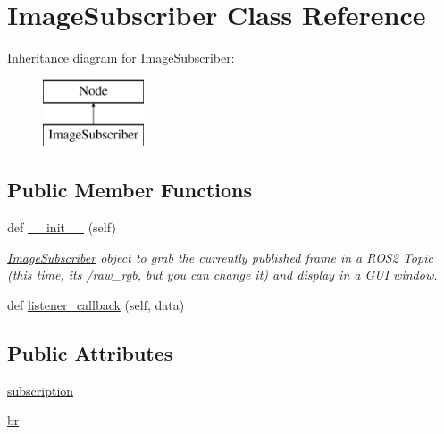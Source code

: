 \hypertarget{classtoxic__vision_1_1webcam__sub_1_1ImageSubscriber}{}\section{Image\+Subscriber Class Reference}
\label{classtoxic__vision_1_1webcam__sub_1_1ImageSubscriber}
Inheritance diagram for Image\+Subscriber\+:\begin{figure}[H]
\begin{center}
\leavevmode
\includegraphics[height=2.000000cm]{db/dd5/classtoxic__vision_1_1webcam__sub_1_1ImageSubscriber}
\end{center}
\end{figure}
\subsection*{Public Member Functions}
\begin{DoxyCompactItemize}
\item 
def \mbox{\hyperlink{classtoxic__vision_1_1webcam__sub_1_1ImageSubscriber_ae64f0875afe3067b97ba370b354b9213}{\+\_\+\+\_\+init\+\_\+\+\_\+}} (self)
\begin{DoxyCompactList}\small\item\em \mbox{\hyperlink{classtoxic__vision_1_1webcam__sub_1_1ImageSubscriber}{Image\+Subscriber}} object to grab the currently published frame in a R\+O\+S2 Topic (this time, it\textquotesingle{}s \textquotesingle{}/raw\+\_\+rgb\textquotesingle{}, but you can change it) and display in a G\+UI window. \end{DoxyCompactList}\item 
def \mbox{\hyperlink{classtoxic__vision_1_1webcam__sub_1_1ImageSubscriber_a23dd9943cb7cb7be2a6e7022a85a1684}{listener\+\_\+callback}} (self, data)
\end{DoxyCompactItemize}
\subsection*{Public Attributes}
\begin{DoxyCompactItemize}
\item 
\mbox{\hyperlink{classtoxic__vision_1_1webcam__sub_1_1ImageSubscriber_a4b0698733c4dfaffe8e2b4cd952b6f82}{subscription}}
\item 
\mbox{\hyperlink{classtoxic__vision_1_1webcam__sub_1_1ImageSubscriber_a88f0860257ba6bdc089557444f5cdd16}{br}}
\end{DoxyCompactItemize}


